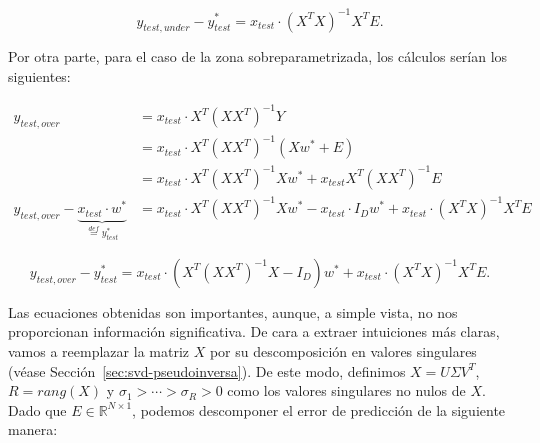 \begin{equation}
    y_{test, under} - y^{*}_{test} = x_{test} \cdot {(X^T X)}^{-1} X^T E.
\end{equation}

Por otra parte, para el caso de la zona sobreparametrizada, los cálculos serían los siguientes:

\begin{align}
    y_{test, over} &= x_{test} \cdot X^{T}{(XX^{T})}^{-1}Y \\
    &= x_{test} \cdot X^{T}{(XX^{T})}^{-1}(X w^{*} + E) \\
    &= x_{test} \cdot X^{T}{(XX^{T})}^{-1}X w^{*} + x_{test}X^{T}{(XX^{T})}^{-1}E \\
    y_{test, over} - \underbrace{x_{test} \cdot w^{*}}_{\overset{def}{=} y^*_{test}} &= x_{test} \cdot X^{T}{(XX^{T})}^{-1}X w^{*} - x_{test} \cdot I_{D} w^{*} + x_{test} \cdot {(X^{T}X)}^{-1}X^{T}E
\end{align}

\begin{equation}
    y_{test, over} - y^{*}_{test} = x_{test} \cdot (X^{T}{(XX^{T})}^{-1}X - I_{D}) w^{*} + x_{test} \cdot {(X^{T}X)}^{-1}X^{T}E.
\end{equation}


Las ecuaciones obtenidas son importantes, aunque, a simple vista, no nos proporcionan información significativa. De cara a extraer intuiciones más claras, vamos a reemplazar la matriz $X$ por su descomposición en valores singulares (véase Sección~\ref{sec:svd-pseudoinversa}). De este modo, definimos $X = U \Sigma V^{T}$, $R = rang(X)$ y $\sigma_1 > \cdots > \sigma_R > 0$ como los valores singulares no nulos de $X$. Dado que $E \in \mathbb{R}^{N \times 1}$, podemos descomponer el error de predicción de la siguiente manera:

